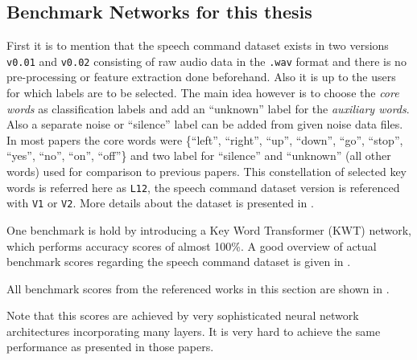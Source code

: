 \subsection{Benchmark Networks for this thesis}\label{sec:prev_kws_benchmark}
First it is to mention that the speech command dataset \cite{Warden2018} exists in two versions \texttt{v0.01} and \texttt{v0.02} consisting of raw audio data in the \texttt{.wav} format and there is no pre-processing or feature extraction done beforehand.
Also it is up to the users for which labels are to be selected.
The main idea however is to choose the \emph{core words} as classification labels and add an \enquote{unknown} label for the \emph{auxiliary words}.
Also a separate noise or \enquote{silence} label can be added from given noise data files.
In most papers the core words were \{\enquote{left},  \enquote{right}, \enquote{up}, \enquote{down}, \enquote{go}, \enquote{stop}, \enquote{yes}, \enquote{no}, \enquote{on}, \enquote{off}\} and two label for \enquote{silence} and \enquote{unknown} (all other words) used for comparison to previous papers.
This constellation of selected key words is referred here as \texttt{L12}, the speech command dataset version is referenced with \texttt{V1} or \texttt{V2}.
More details about the dataset is presented in .

One benchmark is hold by \cite{Berg2021} introducing a Key Word Transformer (KWT) network, which performs accuracy scores of almost 100\%.
A good overview of actual benchmark scores regarding the speech command dataset is given in \cite{PaperswithcodeKWS}.

All benchmark scores from the referenced works in this section are shown in .

Note that this scores are achieved by very sophisticated neural network architectures incorporating many layers.
It is very hard to achieve the same performance as presented in those papers.